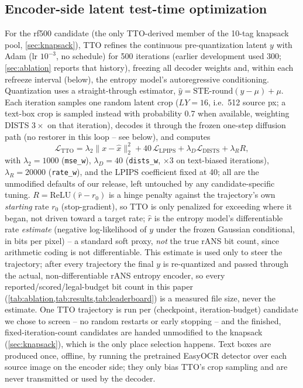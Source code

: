 \documentclass[runningheads]{llncs}
\begin{document}
\subsection{Encoder-side latent test-time optimization}
\label{sec:tto}
For the rf500 candidate (the only TTO-derived member of the 10-tag knapsack pool, \cref{sec:knapsack}), TTO refines the continuous pre-quantization latent $y$ with Adam (lr $10^{-3}$, no schedule) for 500 iterations (earlier development used 300; \cref{sec:ablation} reports that history), freezing all decoder weights and, within each refreeze interval (below), the entropy model's autoregressive conditioning. Quantization uses a straight-through estimator, $\hat y=\mathrm{STE\text{-}round}(y-\mu)+\mu$. Each iteration samples one random latent crop ($LY{=}16$, i.e.\ 512 source px; a text-box crop is sampled instead with probability 0.7 when available, weighting DISTS $3\times$ on that iteration), decodes it through the frozen one-step diffusion path (no restorer in this loop -- see below), and computes
\begin{equation}
 \mathcal{L}_{\mathrm{TTO}}=\lambda_2\|x-\hat{x}\|_2^2+40\,\mathcal{L}_{\mathrm{LPIPS}}+\lambda_D\mathcal{L}_{\mathrm{DISTS}}+\lambda_R R,
 \label{eq:tto}
\end{equation}
with $\lambda_2{=}1000$ (\texttt{mse\_w}), $\lambda_D{=}40$ (\texttt{dists\_w}, $\times3$ on text-biased iterations), $\lambda_R{=}20000$ (\texttt{rate\_w}), and the LPIPS coefficient fixed at 40; all are the unmodified defaults of our release, left untouched by any candidate-specific tuning. $R=\mathrm{ReLU}(\hat{r}-r_0)$ is a hinge penalty against the trajectory's own \emph{starting} rate $r_0$ (stop-gradient), so TTO is only penalized for exceeding where it began, not driven toward a target rate; $\hat r$ is the entropy model's differentiable rate \emph{estimate} (negative log-likelihood of $y$ under the frozen Gaussian conditional, in bits per pixel) -- a standard soft proxy, \emph{not} the true rANS bit count, since arithmetic coding is not differentiable. This estimate is used only to steer the trajectory; after every trajectory the final $y$ is re-quantized and passed through the actual, non-differentiable rANS entropy encoder, so every reported/scored/legal-budget bit count in this paper (\cref{tab:ablation,tab:results,tab:leaderboard}) is a measured file size, never the estimate. One TTO trajectory is run per (checkpoint, iteration-budget) candidate we chose to screen -- no random restarts or early stopping -- and the finished, fixed-iteration-count candidates are handed unmodified to the knapsack (\cref{sec:knapsack}), which is the only place selection happens. Text boxes are produced once, offline, by running the pretrained EasyOCR detector over each source image on the encoder side; they only bias TTO's crop sampling and are never transmitted or used by the decoder.
\end{document}
